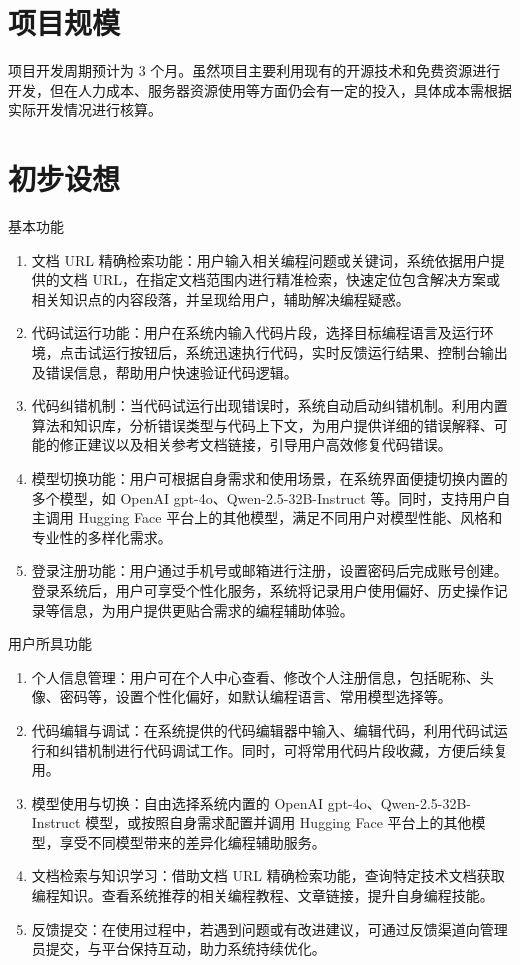 \documentclass[
    report,     %
    oneside,    %
    UTF8,       %
    zihao=-4    %
]{config} %
\begin{document}
\section{项目规模}
项目开发周期预计为 3 个月。虽然项目主要利用现有的开源技术和免费资源进行开发，但在人力成本、服务器资源使用等方面仍会有一定的投入，具体成本需根据实际开发情况进行核算。

\section{初步设想}
基本功能
\begin{enumerate}[itemsep=2pt,topsep=0.6pt,parsep=0.6pt]
\item 文档 URL 精确检索功能：用户输入相关编程问题或关键词，系统依据用户提供的文档 URL，在指定文档范围内进行精准检索，快速定位包含解决方案或相关知识点的内容段落，并呈现给用户，辅助解决编程疑惑。
\item 代码试运行功能：用户在系统内输入代码片段，选择目标编程语言及运行环境，点击试运行按钮后，系统迅速执行代码，实时反馈运行结果、控制台输出及错误信息，帮助用户快速验证代码逻辑。
\item 代码纠错机制：当代码试运行出现错误时，系统自动启动纠错机制。利用内置算法和知识库，分析错误类型与代码上下文，为用户提供详细的错误解释、可能的修正建议以及相关参考文档链接，引导用户高效修复代码错误。
\item 模型切换功能：用户可根据自身需求和使用场景，在系统界面便捷切换内置的多个模型，如 OpenAI gpt-4o、Qwen-2.5-32B-Instruct 等。同时，支持用户自主调用 Hugging Face 平台上的其他模型，满足不同用户对模型性能、风格和专业性的多样化需求。
\item 登录注册功能：用户通过手机号或邮箱进行注册，设置密码后完成账号创建。登录系统后，用户可享受个性化服务，系统将记录用户使用偏好、历史操作记录等信息，为用户提供更贴合需求的编程辅助体验。
\end{enumerate}
用户所具功能
\begin{enumerate}[itemsep=2pt,topsep=0.6pt,parsep=0.6pt]
\item 个人信息管理：用户可在个人中心查看、修改个人注册信息，包括昵称、头像、密码等，设置个性化偏好，如默认编程语言、常用模型选择等。
\item 代码编辑与调试：在系统提供的代码编辑器中输入、编辑代码，利用代码试运行和纠错机制进行代码调试工作。同时，可将常用代码片段收藏，方便后续复用。
\item 模型使用与切换：自由选择系统内置的 OpenAI gpt-4o、Qwen-2.5-32B-Instruct 模型，或按照自身需求配置并调用 Hugging Face 平台上的其他模型，享受不同模型带来的差异化编程辅助服务。
\item 文档检索与知识学习：借助文档 URL 精确检索功能，查询特定技术文档获取编程知识。查看系统推荐的相关编程教程、文章链接，提升自身编程技能。
\item 反馈提交：在使用过程中，若遇到问题或有改进建议，可通过反馈渠道向管理员提交，与平台保持互动，助力系统持续优化。
\end{enumerate}
\end{document}
